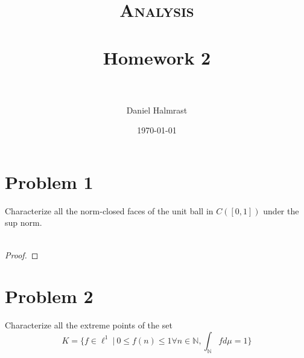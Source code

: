 \documentclass[fontsize=11pt]{scrartcl} %
\title{	
\normalfont \normalsize 
\textsc{Analysis} \\ [25pt] %
\horrule{0.5pt} \\[0.4cm] %
\huge Homework 2 \\ %
\horrule{2pt} \\[0.5cm] %
}
\author{Daniel Halmrast} %
\date{\normalsize\today} %
\numberwithin{equation}{section} %
\numberwithin{figure}{section} %
\numberwithin{table}{section} %
\newcommand{\N}{\mathbb{N}}
\begin{document}
\maketitle %

\section*{Problem 1}
Characterize all the norm-closed faces of the unit ball in $C([0,1])$ under the
sup norm.
\\
\\
\begin{proof}
\end{proof}

\section*{Problem 2}
Characterize all the extreme points of the set
\[
    K = \{ f\in \ell^1\ |\ 0\leq f(n)\leq 1\forall n\in \N, \int_{\N}fd\mu = 1\}
\]
\end{document}
